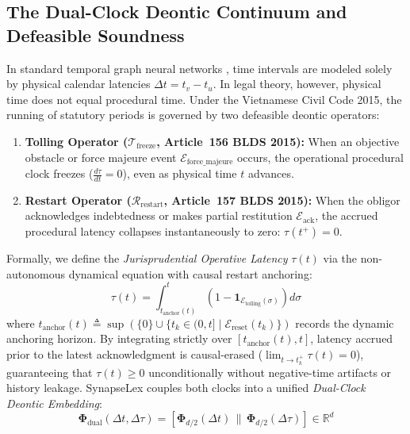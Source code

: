 \documentclass[11pt,a4paper]{article}
\begin{document}
\subsection{The Dual-Clock Deontic Continuum and Defeasible Soundness}
\label{sec:dual_clock}
In standard temporal graph neural networks \citep{xu2020inductive}, time intervals are modeled solely by physical calendar latencies $\Delta t = t_v - t_u$. In legal theory, however, physical time does not equal procedural time. Under the Vietnamese Civil Code 2015, the running of statutory periods is governed by two defeasible deontic operators:
\begin{enumerate}[leftmargin=*]
    \item \textbf{Tolling Operator ($\mathcal{T}_{\text{freeze}}$, Article~156 BLDS 2015):} When an objective obstacle or force majeure event $\mathcal{E}_{\text{force\_majeure}}$ occurs, the operational procedural clock freezes ($\frac{d\tau}{dt} = 0$), even as physical time $t$ advances.
    \item \textbf{Restart Operator ($\mathcal{R}_{\text{restart}}$, Article~157 BLDS 2015):} When the obligor acknowledges indebtedness or makes partial restitution $\mathcal{E}_{\text{ack}}$, the accrued procedural latency collapses instantaneously to zero: $\tau(t^+) = 0$.
\end{enumerate}
Formally, we define the \textit{Jurisprudential Operative Latency} $\tau(t)$ via the non-autonomous dynamical equation with causal restart anchoring:
\begin{equation}
\label{eq:dual_clock}
\tau(t) = \int_{t_{\text{anchor}}(t)}^t \left(1 - \mathbf{1}_{\mathcal{E}_{\text{tolling}}(\sigma)}\right) d\sigma
\end{equation}
where $t_{\text{anchor}}(t) \triangleq \sup\left(\{0\} \cup \{t_k \in (0, t] \mid \mathcal{E}_{\text{reset}}(t_k)\}\right)$ records the dynamic anchoring horizon. By integrating strictly over $[t_{\text{anchor}}(t), t]$, latency accrued prior to the latest acknowledgment is causal-erased ($\lim_{t \to t_k^+} \tau(t) = 0$), guaranteeing that $\tau(t) \ge 0$ unconditionally without negative-time artifacts or history leakage.
SynapseLex couples both clocks into a unified \textit{Dual-Clock Deontic Embedding}:
\begin{equation}
\label{eq:dual_embedding}
\mathbf{\Phi}_{\text{dual}}(\Delta t, \Delta \tau) = \left[ \mathbf{\Phi}_{d/2}(\Delta t) \,\|\, \mathbf{\Phi}_{d/2}(\Delta \tau) \right] \in \mathbb{R}^d
\end{equation}
\end{document}
